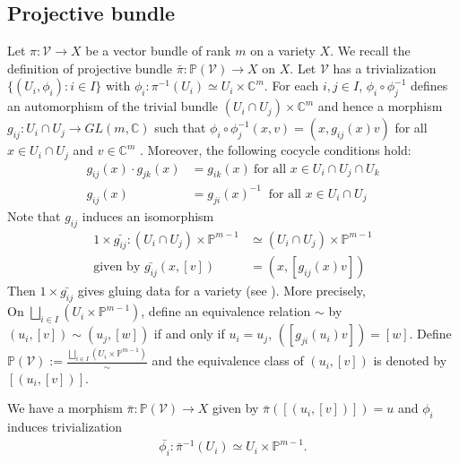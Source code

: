 \documentclass[12pt,reqno]{amsart}
\numberwithin{equation}{section}
\theoremstyle{definition}
\begin{document}
\subsection{Projective bundle}\label{definition:projective bundle} Let  $\pi:\mathcal{V}\longrightarrow X$ be a
vector bundle of rank $m$ on a variety $X$. We recall the definition of projective bundle $\bar{\pi}:\mathbb{P}(\mathcal{V})\longrightarrow X$ on $X$. Let $\mathcal{V}$ has a trivialization $\{(U_{i},\phi_{i}):i\in I\}$ with $\phi_{i}: \pi^{-1}(U_{i})\simeq U_{i}\times \mathbb{C}^{m}$. For each $i,j\in I$, $\phi_{i}\circ\phi_{j}^{-1}$ defines an automorphism of the trivial bundle $(U_{i}\cap U_{j})\times\mathbb{C}^{m}$ and hence a morphism
$g_{ij}:U_{i}\cap U_{j}\longrightarrow GL(m,\mathbb{C})$ such that $\phi_{i}\circ\phi_{j}^{-1}(x,v)=(x,g_{ij}(x)v)$ for all $x\in U_{i}\cap U_{j}$ and $v\in \mathbb{C}^{m}$ . Moreover, the following cocycle conditions hold:\begin{align*}
	g_{ij}(x)\cdot g_{jk}(x)&=g_{ik}(x)\ \text{for all $x\in U_{i}\cap U_{j}\cap U_{k}$}\\
	g_{ij}(x)&=g_{ji}(x)^{-1}\ \text{ for all $x\in U_{i}\cap U_{j}$}
\end{align*}
Note that $g_{ij}$ induces an isomorphism
\begin{align*}
	1\times \bar{g_{ij}}:(U_{i}\cap U_{j})\times \mathbb{P}^{m-1}&\simeq(U_{i}\cap U_{j})\times \mathbb{P}^{m-1}\\
	\text{given by }\bar{g_{ij}}(x,[v])&=(x,[g_{ij}(x)v])
\end{align*} 
Then $1\times \bar{g_{ij}}$ gives gluing data for a variety (see \cite[Ex 2.12, p.80]{Ha}). More precisely, \\
On $\bigsqcup_{i\in I}(U_{i}\times\mathbb{P}^{m-1})$, define an equivalence relation $\sim$ by $(u_{i},[v])\sim (u_{j},[w])$ if and only if $u_{i}=u_{j}$, $([g_{ji}(u_{i})v])=[w]$. Define $\mathbb{P}(\mathcal{V}):=\frac{\bigsqcup_{i\in I}(U_{i}\times\mathbb{P}^{m-1})}{\sim}$ and the equivalence class of $(u_{i},[v])$ is denoted by $[(u_{i},[v])]$.

We have a morphism $\bar{\pi}:\mathbb{P}(\mathcal{V})\longrightarrow X$ given by $\bar{\pi}([(u_{i},[v])])=u$ and $\phi_{i}$ induces trivialization
\begin{align*}
	\bar{\phi_{i}}:\bar{\pi}^{-1}(U_{i})\simeq U_{i}\times\mathbb{P}^{m-1}.
\end{align*}
\end{document}
